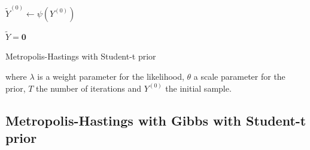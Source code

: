 \documentclass[12pt]{memoir}
\newcommand{\mb}{\mathbf}
\begin{document}
\begin{algorithm}[H]

    \DontPrintSemicolon







    $\tilde Y^{(0)} \gets \psi(Y^{(0)})$\;

    $\tilde Y = \mb 0$\;


    \caption{Metropolis-Hastings with Student-t prior}

\end{algorithm}\medbreak

where $\lambda$ is a weight parameter for the likelihood, $\theta$ a scale parameter for the prior, $T$ the number of iterations and $Y^{(0)}$ the initial sample.\medbreak



\subsection*{Metropolis-Hastings with Gibbs with Student-t prior}
\end{document}
